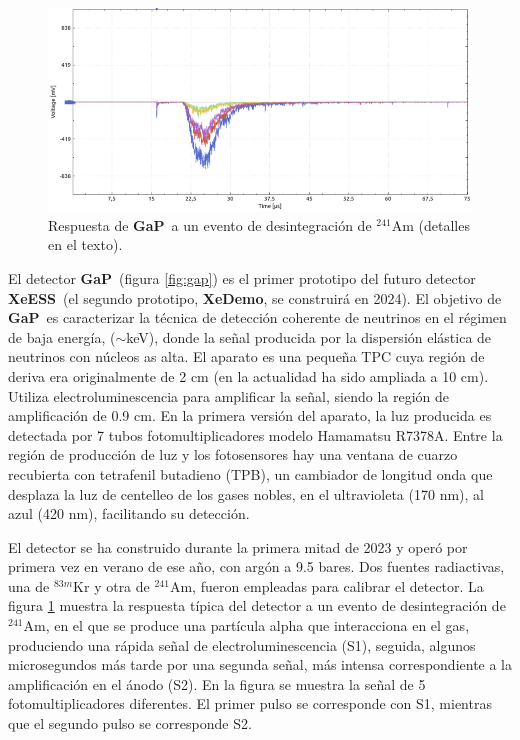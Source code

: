 \documentclass[12pt,a4paper,article]{report} %
\def\xess{{\bf XeESS}}
\def\xed{{\bf XeDemo}}
\def\gap{{\bf GaP}}
\begin{document}
\begin{figure}[bht!]
\begin{center}
\includegraphics[width=12cm]{img/wvfm.png}
\caption{Respuesta de \gap\ a un evento de desintegración de ${}^{241}$Am (detalles en el texto).}
\label{fig:wvf}
\end{center}
\end{figure}

El detector \gap\ (figura \ref{fig:gap}) es el primer prototipo del futuro detector \xess\ (el segundo prototipo, \xed, se construirá en 2024). El objetivo de \gap\ es  caracterizar la técnica de detección coherente de neutrinos en el régimen de baja energía, ($\sim$keV), donde la señal producida por la dispersión elástica de neutrinos con núcleos as alta. El aparato es una pequeña TPC cuya región de deriva era originalmente de 2 cm (en la actualidad ha sido ampliada a 10 cm). Utiliza electroluminescencia para amplificar la señal, siendo la región de amplificación de 0.9 cm. En la primera versión del aparato, la luz producida es detectada por 7 tubos fotomultiplicadores modelo Hamamatsu R7378A. Entre la región de producción de luz y los fotosensores hay una ventana de cuarzo recubierta con tetrafenil butadieno (TPB), un cambiador de longitud onda que desplaza la luz de centelleo de los gases nobles, en el ultravioleta (170 nm), al azul (420 nm), facilitando su detección.

El detector se ha construido durante la primera mitad de 2023 y operó por primera vez en verano de ese año, con argón a 9.5 bares. Dos fuentes radiactivas, una de ${}^{83m}$Kr y otra de ${}^{241}$Am, fueron empleadas para calibrar el detector. La figura \ref{fig:wvf} muestra la respuesta típica del detector a un evento de desintegración de ${}^{241}$Am, en el que se produce una partícula alpha que interacciona en el gas, produciendo una rápida señal de electroluminescencia (S1), seguida, algunos microsegundos más tarde por una segunda señal, más intensa correspondiente a la amplificación en el ánodo (S2). En la figura se muestra la señal de 5 fotomultiplicadores diferentes. El primer pulso se corresponde con S1, mientras que el segundo pulso se corresponde S2. 
\end{document}
